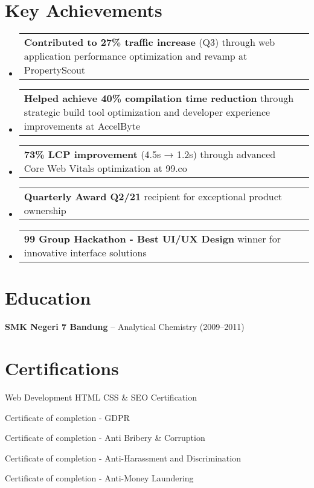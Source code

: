 \documentclass[a4paper, 11pt]{article}
\makeatletter
\newcommand{\resumeProjectHeading}[2]{
    \item
    \begin{tabular*}{0.987\textwidth}{l@{\extracolsep{\fill}}r}
      \small#1\\
    \end{tabular*}\vspace{-7pt}
}
\newcommand{\resumeSubHeadingListStart}{\begin{itemize}[leftmargin=0.1in, label={}]}
\newcommand{\resumeSubHeadingListEnd}{\end{itemize}\vspace{5pt}}
\makeatother
\begin{document}
\section{Key Achievements}
    \resumeSubHeadingListStart
        \resumeProjectHeading
            {\textbf{Contributed to 27\% traffic increase} (Q3) through web application performance optimization and revamp at PropertyScout}{}
        \resumeProjectHeading
            {\textbf{Helped achieve 40\% compilation time reduction} through strategic build tool optimization and developer experience improvements at AccelByte}{}
        \resumeProjectHeading
            {\textbf{73\% LCP improvement} (4.5s → 1.2s) through advanced Core Web Vitals optimization at 99.co}{}
        \resumeProjectHeading
            {\textbf{Quarterly Award Q2/21} recipient for exceptional product ownership}{}
        \resumeProjectHeading
            {\textbf{99 Group Hackathon - Best UI/UX Design} winner for innovative interface solutions}{}
    \resumeSubHeadingListEnd

\section{Education}
    \resumeSubHeadingListStart
        \small{
            \item \textbf{SMK Negeri 7 Bandung} -- Analytical Chemistry (2009--2011)
        }
    \resumeSubHeadingListEnd

\section{Certifications}
    \resumeSubHeadingListStart
        \small{
            \item Web Development HTML CSS \& SEO Certification
            \item Certificate of completion - GDPR
            \item Certificate of completion - Anti Bribery \& Corruption
            \item Certificate of completion - Anti-Harassment and Discrimination
            \item Certificate of completion - Anti-Money Laundering
        }
    \resumeSubHeadingListEnd

\end{document}
